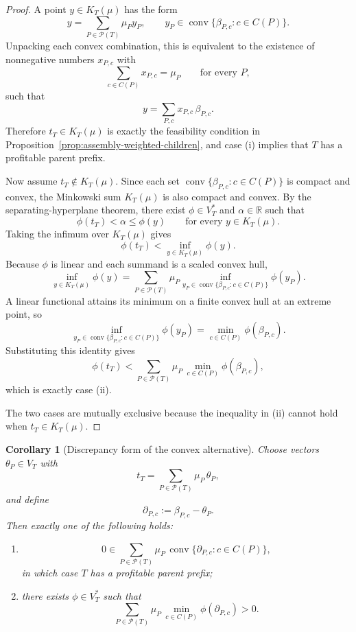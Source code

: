 \documentclass[11pt]{article}
\newtheorem{corollary}[theorem]{Corollary}
\theoremstyle{definition}
\newcommand{\R}{\mathbb{R}}
\newcommand{\1}{\mathbf{1}}
\begin{document}
\begin{proof}
A point $y\in K_T(\mu)$ has the form
\[
y=\sum_{P\in \mathcal P(T)} \mu_P y_P,
\qquad
y_P\in \operatorname{conv}\{\beta_{P,c}:c\in C(P)\}.
\]
Unpacking each convex combination, this is equivalent to the existence of nonnegative numbers $x_{P,c}$ with
\[
\sum_{c\in C(P)} x_{P,c}=\mu_P
\qquad\text{for every }P,
\]
such that
\[
y=\sum_{P,c} x_{P,c}\,\beta_{P,c}.
\]
Therefore $t_T\in K_T(\mu)$ is exactly the feasibility condition in Proposition~\ref{prop:assembly-weighted-children}, and case (i) implies that $T$ has a profitable parent prefix.

Now assume $t_T\notin K_T(\mu)$.
Since each set $\operatorname{conv}\{\beta_{P,c}:c\in C(P)\}$ is compact and convex, the Minkowski sum $K_T(\mu)$ is also compact and convex.
By the separating-hyperplane theorem, there exist $\phi\in V_T^\ast$ and $\alpha\in \R$ such that
\[
\phi(t_T)<\alpha\le \phi(y)
\qquad\text{for every }y\in K_T(\mu).
\]
Taking the infimum over $K_T(\mu)$ gives
\[
\phi(t_T)
<
\inf_{y\in K_T(\mu)} \phi(y).
\]
Because $\phi$ is linear and each summand is a scaled convex hull,
\[
\inf_{y\in K_T(\mu)} \phi(y)
=
\sum_{P\in \mathcal P(T)} \mu_P
\inf_{y_P\in \operatorname{conv}\{\beta_{P,c}:c\in C(P)\}} \phi(y_P).
\]
A linear functional attains its minimum on a finite convex hull at an extreme point, so
\[
\inf_{y_P\in \operatorname{conv}\{\beta_{P,c}:c\in C(P)\}} \phi(y_P)
=
\min_{c\in C(P)} \phi(\beta_{P,c}).
\]
Substituting this identity gives
\[
\phi(t_T)
<
\sum_{P\in \mathcal P(T)} \mu_P\,\min_{c\in C(P)} \phi(\beta_{P,c}),
\]
which is exactly case (ii).

The two cases are mutually exclusive because the inequality in (ii) cannot hold when $t_T\in K_T(\mu)$.
\end{proof}

\begin{corollary}[Discrepancy form of the convex alternative]\label{cor:exact-convex-lift-discrepancy}
Choose vectors $\theta_P\in V_T$ with
\[
t_T=\sum_{P\in \mathcal P(T)} \mu_P\,\theta_P,
\]
and define
\[
\partial_{P,c}:=\beta_{P,c}-\theta_P.
\]
Then exactly one of the following holds:
\begin{enumerate}[label=(\roman*),leftmargin=2.2em]
\item
\[
0\in \sum_{P\in \mathcal P(T)} \mu_P\,\operatorname{conv}\{\partial_{P,c}:c\in C(P)\},
\]
in which case $T$ has a profitable parent prefix;
\item there exists $\phi\in V_T^\ast$ such that
\[
\sum_{P\in \mathcal P(T)} \mu_P\,\min_{c\in C(P)} \phi(\partial_{P,c})>0.
\]
\end{enumerate}
\end{corollary}
\end{document}
